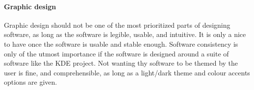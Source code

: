 \documentclass[a4paper,10pt]{article}
\begin{document}
\paragraph{Graphic design}

Graphic design should not be one of the most prioritized parts of designing software, as long as the software is legible, usable, and intuitive. It is only a nice to have once the software is usable and stable enough. Software consistency is only of the utmost importance if the software is designed around a suite of software like the KDE project. Not wanting thy software to be themed by the user is fine, and comprehensible, as long as a light/dark theme and colour accents options are given.
\end{document}
